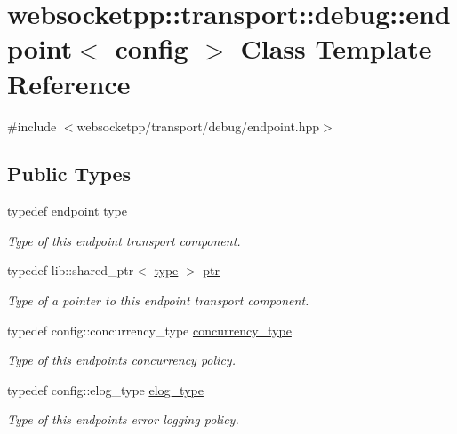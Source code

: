 \hypertarget{classwebsocketpp_1_1transport_1_1debug_1_1endpoint}{}\section{websocketpp\+:\+:transport\+:\+:debug\+:\+:endpoint$<$ config $>$ Class Template Reference}
\label{classwebsocketpp_1_1transport_1_1debug_1_1endpoint}


{\ttfamily \#include $<$websocketpp/transport/debug/endpoint.\+hpp$>$}

\subsection*{Public Types}
\begin{DoxyCompactItemize}
\item 
typedef \hyperlink{classwebsocketpp_1_1transport_1_1debug_1_1endpoint}{endpoint} \hyperlink{classwebsocketpp_1_1transport_1_1debug_1_1endpoint_ad8bdfc73f0351c08dbe64143cd224ac0}{type}
\begin{DoxyCompactList}\small\item\em Type of this endpoint transport component. \end{DoxyCompactList}\item 
typedef lib\+::shared\+\_\+ptr$<$ \hyperlink{classwebsocketpp_1_1transport_1_1debug_1_1endpoint_ad8bdfc73f0351c08dbe64143cd224ac0}{type} $>$ \hyperlink{classwebsocketpp_1_1transport_1_1debug_1_1endpoint_a947f3252f16c34680638f0ed9ef95aa3}{ptr}
\begin{DoxyCompactList}\small\item\em Type of a pointer to this endpoint transport component. \end{DoxyCompactList}\item 
typedef config\+::concurrency\+\_\+type \hyperlink{classwebsocketpp_1_1transport_1_1debug_1_1endpoint_adbe41c60a84f148cbdce15a0535ac2e9}{concurrency\+\_\+type}
\begin{DoxyCompactList}\small\item\em Type of this endpoint\textquotesingle{}s concurrency policy. \end{DoxyCompactList}\item 
typedef config\+::elog\+\_\+type \hyperlink{classwebsocketpp_1_1transport_1_1debug_1_1endpoint_a3616bf82ba2a1026fad9de8145bd9375}{elog\+\_\+type}
\begin{DoxyCompactList}\small\item\em Type of this endpoint\textquotesingle{}s error logging policy. \end{DoxyCompactList}\item 

\end{DoxyCompactItemize}
